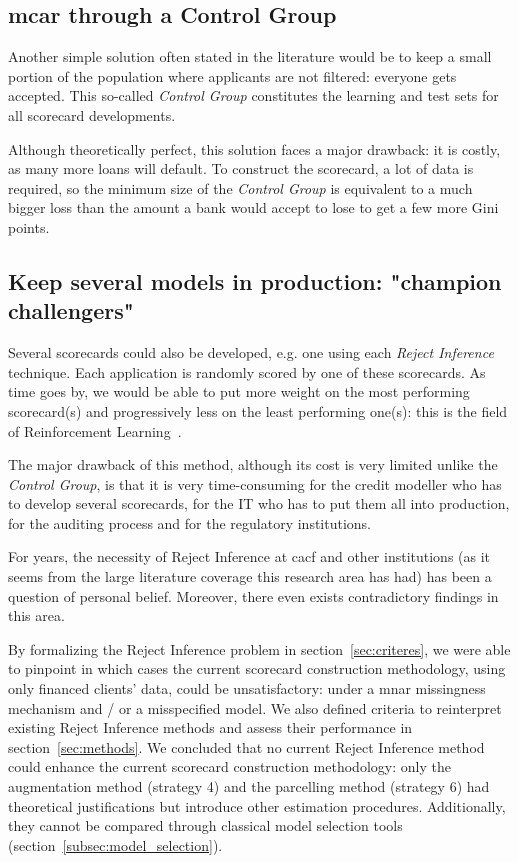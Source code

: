 \subsection{\gls{mcar} through a Control Group}

Another simple solution often stated in the literature would be to keep a small portion of the population where applicants are not filtered: everyone gets accepted. This so-called \textit{Control Group} constitutes the learning and test sets for all scorecard developments.

Although theoretically perfect, this solution faces a major drawback: it is costly, as many more loans will default. To construct the scorecard, a lot of data is required, so the minimum size of the \textit{Control Group} is equivalent to a much bigger loss than the amount a bank would accept to lose to get a few more Gini points.

\subsection{Keep several models in production: "champion challengers"}

Several scorecards could also be developed, e.g. one using each \textit{Reject Inference} technique. Each application is randomly scored by one of these scorecards. As time goes by, we would be able to put more weight on the most performing scorecard(s) and progressively less on the least performing one(s): this is the field of Reinforcement Learning~\cite{Sutton1998}.

The major drawback of this method, although its cost is very limited unlike the \textit{Control Group}, is that it is very time-consuming for the credit modeller who has to develop several scorecards, for the IT who has to put them all into production, for the auditing process and for the regulatory institutions.

\bigskip

For years, the necessity of {Reject Inference} at \gls{cacf} and other institutions (as it seems from the large literature coverage this research area has had) has been a question of personal belief. Moreover, there even exists contradictory findings in this area.

By formalizing the {Reject Inference} problem in section~\ref{sec:criteres}, we were able to pinpoint in which cases the current scorecard construction methodology, using only financed clients' data, could be unsatisfactory: under a \gls{mnar} missingness mechanism and / or a misspecified model. We also defined criteria to reinterpret existing {Reject Inference} methods and assess their performance in section~\ref{sec:methods}. We concluded that no current {Reject Inference} method could enhance the current scorecard construction methodology: only the augmentation method (strategy 4) and the parcelling method (strategy 6) had theoretical justifications but introduce other estimation procedures. Additionally, they cannot be compared through classical model selection tools (section~\ref{subsec:model_selection}).

